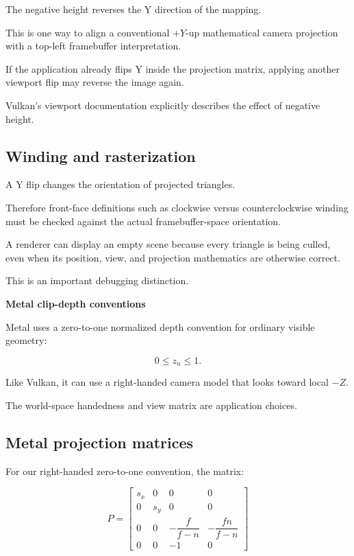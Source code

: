 The negative height reverses the Y direction of the mapping.

This is one way to align a conventional \(+Y\)-up mathematical camera projection with a top-left framebuffer interpretation.

If the application already flips Y inside the projection matrix, applying another viewport flip may reverse the image again.

Vulkan's viewport documentation explicitly describes the effect of negative height. 

\subsection{Winding and rasterization}\label{02-foundations-ii-ch033-winding-and-rasterization}

A Y flip changes the orientation of projected triangles.

Therefore front-face definitions such as clockwise versus counterclockwise winding must be checked against the actual framebuffer-space orientation.

A renderer can display an empty scene because every triangle is being culled, even when its position, view, and projection mathematics are otherwise correct.

This is an important debugging distinction.

\textbf{Metal clip-depth conventions}

Metal uses a zero-to-one normalized depth convention for ordinary visible geometry:

\[
 \boxed{ 0\le z_n\le1 }.
\]

Like Vulkan, it can use a right-handed camera model that looks toward local \(-Z\).

The world-space handedness and view matrix are application choices.

\subsection{Metal projection matrices}\label{02-foundations-ii-ch033-metal-projection-matrices}

For our right-handed zero-to-one convention, the matrix:

\[
 P= \begin{bmatrix} s_x&0&0&0\\ 0&s_y&0&0\\ 0&0&-\dfrac f{f-n}&-\dfrac{fn}{f-n}\\ 0&0&-1&0 \end{bmatrix}
\]

